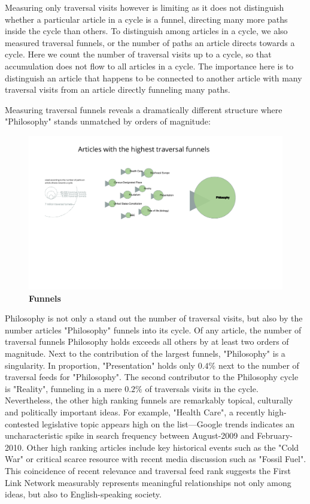 \documentclass[pre,twocolumn,twoside,superscriptaddress,floatfix, aps, 10pt]{revtex4-1}
\begin{document}
Measuring only traversal visits however is limiting as it does not distinguish whether a particular article in a cycle 
is a funnel, directing many more paths inside the cycle than others. 
To distinguish among articles in a cycle, we also measured traversal funnels, or the number of 
paths an article directs towards a cycle. Here we count the number of traversal visits up to a cycle, 
so that accumulation does not flow to all articles in a cycle.
The importance here is to distinguish an article that happens to be connected to another article with many traversal visits 
from an article directly funneling many paths.

Measuring traversal funnels reveals a dramatically different structure where "Philosophy" stands unmatched by orders of magnitude:
\begin{figure}[tp!]
  \centering	
  \includegraphics[width=\textwidth]{graphics/funnels.pdf}
  \caption{
    \textbf{Funnels}
  }
  \label{fig:Funnels}
\end{figure}

Philosophy is not only a stand out the number of traversal visits, but also by the number articles "Philosophy" funnels into
its cycle. Of any article, the number of traversal funnels Philosophy holds exceeds 
all others by at least two orders of magnitude.
Next to the contribution of the largest funnels, "Philosophy" is a singularity. 
In proportion, "Presentation" holds only $0.4\%$ next to the number of traversal feeds for "Philosophy".
The second contributor to the Philosophy cycle is "Reality", funneling in a mere $0.2\%$ of traversals visits in the cycle.
Nevertheless, the other high ranking funnels are remarkably topical, culturally and politically important ideas.  For example, "Health Care", a recently high-contested legislative topic appears high on the list---Google trends indicates an uncharacteristic spike in search frequency between August-2009 and February-2010.
Other high ranking articles include key historical events such as the "Cold War" or critical scarce resource with recent 
media discussion such as "Fossil Fuel".
This coincidence of recent relevance and traversal feed rank suggests the First Link Network measurably represents
meaningful relationships not only among ideas, but also to English-speaking society. 
\end{document}
